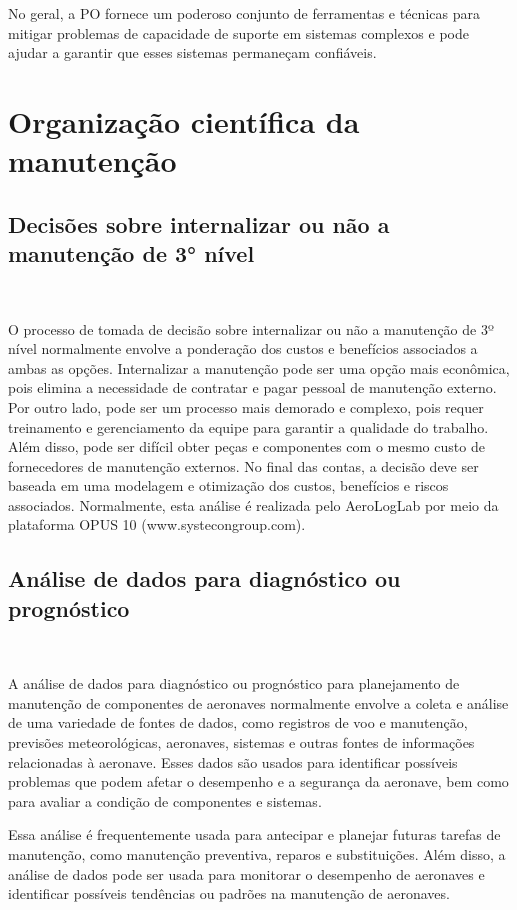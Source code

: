 \documentclass{amsart}
\begin{document}
No geral, a PO fornece um poderoso conjunto de ferramentas e técnicas para mitigar problemas de capacidade de suporte em sistemas complexos e pode ajudar a garantir que esses sistemas permaneçam confiáveis.


\section{Organização científica da manutenção}


\subsection{Decisões sobre internalizar ou não a manutenção de 3° nível}\

O processo de tomada de decisão sobre internalizar ou não a manutenção de 3º nível normalmente envolve a ponderação dos custos e benefícios associados a ambas as opções. Internalizar a manutenção pode ser uma opção mais econômica, pois elimina a necessidade de contratar e pagar pessoal de manutenção externo. Por outro lado, pode ser um processo mais demorado e complexo, pois requer treinamento e gerenciamento da equipe para garantir a qualidade do trabalho. Além disso, pode ser difícil obter peças e componentes com o mesmo custo de fornecedores de manutenção externos. No final das contas, a decisão deve ser baseada em uma modelagem e otimização dos custos, benefícios e riscos associados.
Normalmente, esta análise é realizada pelo AeroLogLab por meio da plataforma OPUS 10 (www.systecongroup.com).

\subsection{Análise de dados para diagnóstico ou prognóstico}\

A análise de dados para diagnóstico ou prognóstico para planejamento de manutenção de componentes de aeronaves normalmente envolve a coleta e análise de uma variedade de fontes de dados, como registros de voo e manutenção, previsões meteorológicas, aeronaves, sistemas e outras fontes de informações relacionadas à aeronave. Esses dados são usados para identificar possíveis problemas que podem afetar o desempenho e a segurança da aeronave, bem como para avaliar a condição de componentes e sistemas.

Essa análise é frequentemente usada para antecipar e planejar futuras tarefas de manutenção, como manutenção preventiva, reparos e substituições. Além disso, a análise de dados pode ser usada para monitorar o desempenho de aeronaves e identificar possíveis tendências ou padrões na manutenção de aeronaves.
\end{document}
